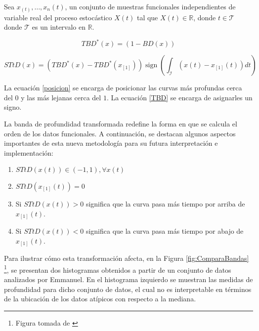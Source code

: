     \begin{defn}

        Sea  $x_(t), \dots , x_n(t)$, un conjunto de muestras funcionales independientes de variable real del proceso estocástico $X(t)$ tal que $X(t) \in \mathbb{R}$,  donde $t \in \mathcal{T}$ donde $\mathcal{T}$ es un intervalo en $\mathbb{R}$. 

    \begin{equation}\label{posicion}
        T B D^*(x)=(1-B D(x))
    \end{equation}
    
    \begin{equation}\label{TBD}
    STtD(x)=\left(T B D^*(x)-T B D^*\left(x_{[1]}\right)\right) \operatorname{sign}\left(\int_{\mathcal{I}}\left(x(t)-x_{[1]}(t)\right) d t\right)
    \end{equation}

    La ecuación \eqref{posicion} se encarga de posicionar las curvas más profundas cerca del $0$ y las más lejanas cerca del $1$. La ecuación \eqref{TBD} se encarga de asignarles un signo.
        
    \end{defn}


La banda de profundidad transformada redefine la forma en que se calcula el orden de los datos funcionales. A continuación, se destacan algunos aspectos importantes de esta nueva metodología para su futura interpretación e implementación:

\begin{enumerate}
    \item $STtD(x(t)) \in (-1, 1), \forall x(t)$
    \item $STtD(x_{[1]}(t)) = 0$
    \item Si $STtD(x(t)) > 0$ significa que la curva pasa más tiempo por arriba de $x_{[1]}(t)$.
    \item Si $STtD(x(t)) < 0$ significa que la curva pasa más tiempo por abajo de $x_{[1]}(t)$.
\end{enumerate}

Para ilustrar cómo esta transformación afecta, en la Figura \ref{fig:ComparaBandas} \footnote{Figura tomada de \cite{BandaEmanuel}}, se presentan dos histogramas obtenidos a partir de un conjunto de datos analizados por Emmanuel. En el histograma izquierdo se muestran las medidas de profundidad para dicho conjunto de datos, el cual no es interpretable en términos de la ubicación de los datos atípicos con respecto a la mediana.

